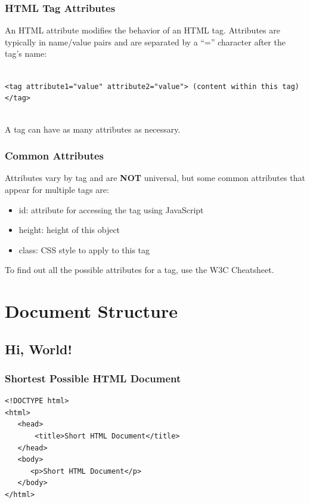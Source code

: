 \documentclass[aspectratio=169]{beamer}
\begin{document}
\begin{frame}
\frametitle{HTML Tag Attributes}
An HTML attribute modifies the behavior of an HTML tag. Attributes are typically in name/value pairs and are separated by a ``='' character after the tag's name:

\pause
\mbox{}\\
\texttt{<tag attribute1="value" attribute2="value"> (content within this tag)</tag>}

\pause
\mbox{}\\
A tag can have as many attributes as necessary.
\end{frame}

\begin{frame}
\frametitle{Common Attributes}
Attributes vary by tag and are \textbf{NOT} universal, but some common attributes that appear for multiple tags are:
\begin{itemize}
	\item id: attribute for accessing the tag using JavaScript
	\item height: height of this object
	\item class: CSS style to apply to this tag
\end{itemize}
To find out all the possible attributes for a tag, use the W3C Cheatsheet. \cite{w3c}
\end{frame}

\section{Document Structure}
\subsection{Hi, World!}
\begin{frame}[fragile]
\frametitle{Shortest Possible HTML Document}
\begin{lstlisting}[caption=Shortest Possible HTML Document,label=code:html]
<!DOCTYPE html>
<html>
   <head>
       <title>Short HTML Document</title>
   </head>
   <body>
      <p>Short HTML Document</p>
   </body>
</html>
\end{lstlisting}
\end{frame}
\end{document}
